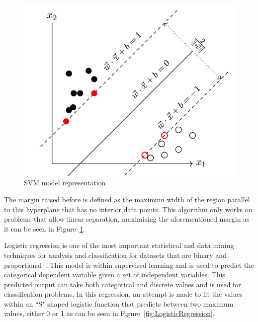 \begin{figure}[!htp]
    \centering
    \includegraphics[scale=0.4]{img/detection/SVM.png}
    \caption{SVM model representation}
    \label{fig:SVM}
\end{figure}

The margin raised before is defined as the maximum width of the region parallel to this hyperplane that has no interior data points. This algorithm only works on problems that allow linear separation, maximising the aforementioned margin as it can be seen in Figure~\ref{fig:SVM}.

Logistic regression is one of the most important statistical and data mining techniques for analysis and classification for datasets that are binary and proportional~\cite{maalouf2011logistic}. This model is within supervised learning and is used to predict the categorical dependent variable given a set of independent variables. This predicted output can take both categorical and discrete values and is used for classification problems. In this regression, an attempt is made to fit the values within an ``S" shaped logistic function that predicts between two maximum values, either 0 or 1 as can be seen in Figure~\ref{fig:LogisticRegression}.

